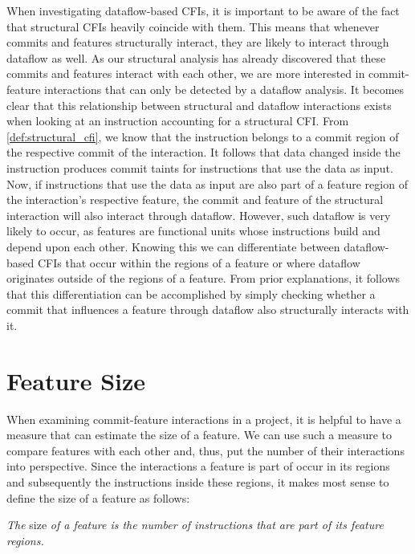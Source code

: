 When investigating dataflow-based CFIs, it is important to be aware of the fact that structural CFIs heavily coincide with them.
This means that whenever commits and features structurally interact, they are likely to interact through dataflow as well.
As our structural analysis has already discovered that these commits and features interact with each other, 
we are more interested in commit-feature interactions that can only be detected by a dataflow analysis.
It becomes clear that this relationship between structural and dataflow interactions exists when looking at an instruction accounting for a structural CFI.
From \autoref{def:structural_cfi}, we know that the instruction belongs to a commit region of the respective commit of the interaction.
It follows that data changed inside the instruction produces commit taints for instructions that use the data as input. 
Now, if instructions that use the data as input are also part of a feature region of the interaction's respective feature, the commit and feature of the structural interaction will also interact through dataflow.
However, such dataflow is very likely to occur, as features are functional units whose instructions build and depend upon each other. 
Knowing this we can differentiate between dataflow-based CFIs that occur within the regions of a feature or where dataflow originates outside of the regions of a feature.
From prior explanations, it follows that this differentiation can be accomplished by simply checking whether a commit that influences a feature through dataflow also structurally interacts with it. 

\section{Feature Size}\label{sec:feature_size}

When examining commit-feature interactions in a project, it is helpful to have a measure that can estimate the size of a feature.
We can use such a measure to compare features with each other and, thus, put the number of their interactions into perspective.
Since the interactions a feature is part of occur in its regions and subsequently the instructions inside these regions, it makes most sense to define the size of a feature as follows:
\begin{definition}\label{def:feature_size}
\emph{The} size \emph{of a feature is the number of instructions that are part of its feature regions.}
\end{definition}

